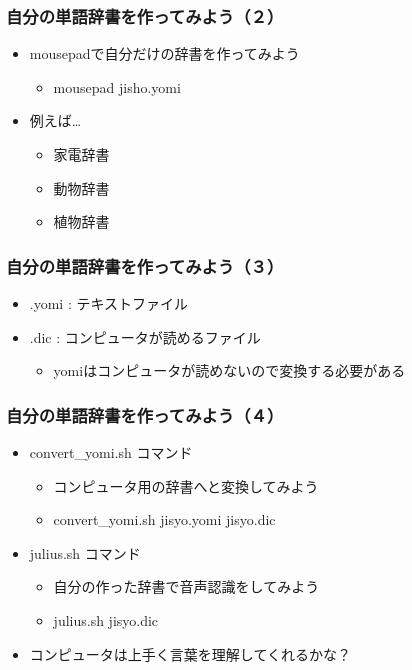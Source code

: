 \documentclass[14pt]{beamer}
\begin{document}
\begin{frame}
  \frametitle{自分の単語辞書を作ってみよう（２）}
  \begin{itemize}
    \item mousepadで自分だけの辞書を作ってみよう
    \begin{itemize}
      \item mousepad jisho.yomi
    \end{itemize}
    \item 例えば…
    \begin{itemize}
      \item 家電辞書
      \item 動物辞書
      \item 植物辞書
    \end{itemize}
  \end{itemize}
\end{frame}

\begin{frame}
  \frametitle{自分の単語辞書を作ってみよう（３）}
  \begin{itemize}
    \item .yomi : テキストファイル
    \item .dic : コンピュータが読めるファイル
    \begin{itemize}
      \item yomiはコンピュータが読めないので変換する必要がある
    \end{itemize}
  \end{itemize}
\end{frame}

\begin{frame}
  \frametitle{自分の単語辞書を作ってみよう（４）}
  \begin{itemize}
    \item convert\_yomi.sh コマンド
    \begin{itemize}   
      \item コンピュータ用の辞書へと変換してみよう
      \item convert\_yomi.sh jisyo.yomi  jisyo.dic
    \end{itemize}
    \item julius.sh コマンド
    \begin{itemize}
      \item 自分の作った辞書で音声認識をしてみよう
      \item julius.sh jisyo.dic
    \end{itemize}
    \item コンピュータは上手く言葉を理解してくれるかな？
  \end{itemize}
\end{frame}
\end{document}
